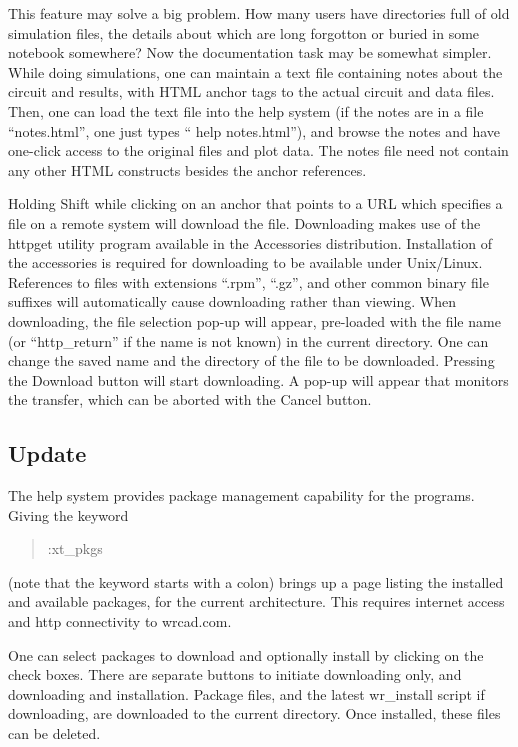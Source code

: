 This feature may solve a big problem.  How many {\WRspice} users have
directories full of old simulation files, the details about which are
long forgotton or buried in some notebook somewhere?  Now the
documentation task may be somewhat simpler.  While doing simulations,
one can maintain a text file containing notes about the circuit and
results, with HTML anchor tags to the actual circuit and data files. 
Then, one can load the text file into the {\WRspice} help system (if
the notes are in a file ``{\vt notes.html}'', one just types ``{\vt
help notes.html}''), and browse the notes and have one-click access to
the original files and plot data.  The notes file need not contain any
other HTML constructs besides the anchor references.

Holding {\kb Shift} while clicking on an anchor that points to a URL
which specifies a file on a remote system will download the file. 
Downloading makes use of the {\vt httpget} utility program available
in the Accessories distribution.  Installation of the accessories is
required for downloading to be available under Unix/Linux.  References
to files with extensions ``{\vt .rpm}'', ``{\vt .gz}'', and other
common binary file suffixes will automatically cause downloading
rather than viewing.  When downloading, the file selection pop-up will
appear, pre-loaded with the file name (or ``{\vt http\_return}'' if
the name is not known) in the current directory.  One can change the
saved name and the directory of the file to be downloaded.  Pressing
the {\cb Download} button will start downloading.  A pop-up will
appear that monitors the transfer, which can be aborted with the {\cb
Cancel} button.

\subsection{{\XicTools} Update}
\label{update}

The help system provides package management capability for the
{\XicTools} programs.  Giving the keyword
\begin{quote}\vt
:xt\_pkgs
\end{quote}
(note that the keyword starts with a colon) brings up a page listing
the installed and available {\XicTools} packages, for the current
architecture.  This requires internet access and http connectivity to
{\vt wrcad.com}.

One can select packages to download and optionally install by clicking
on the check boxes.  There are separate buttons to initiate
downloading only, and downloading and installation.  Package files,
and the latest {\vt wr\_install} script if downloading, are downloaded
to the current directory.  Once installed, these files can be deleted.

